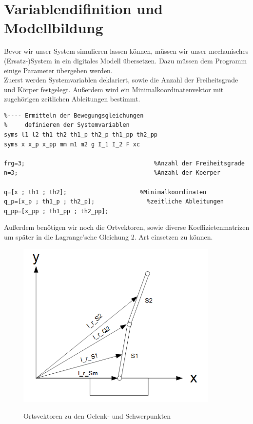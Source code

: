 \documentclass[a4paper, 10pt]{report}
\begin{document}
 \section{Variablendifinition und Modellbildung}
Bevor wir unser System simulieren lassen können, müssen wir unser mechanisches (Ersatz-)System in ein digitales Modell übersetzen. Dazu müssen dem Programm einige Parameter übergeben werden.\\
Zuerst werden Systemvariablen deklariert, sowie die Anzahl der Freiheitsgrade und Körper festgelegt. Außerdem wird ein Minimalkoordinatenvektor mit zugehörigen zeitlichen Ableitungen bestimmt.
\begin{lstlisting}
%---- Ermitteln der Bewegungsgleichungen
%     definieren der Systemvariablen
syms l1 l2 th1 th2 th1_p th2_p th1_pp th2_pp
syms x x_p x_pp mm m1 m2 g I_1 I_2 F xc

frg=3;                                     %Anzahl der Freiheitsgrade
n=3;                                       %Anzahl der Koerper

q=[x ; th1 ; th2];                     %Minimalkoordinaten
q_p=[x_p ; th1_p ; th2_p];               %zeitliche Ableitungen
q_pp=[x_pp ; th1_pp ; th2_pp];
\end{lstlisting}
\newpage \noindent
Außerdem benötigen wir noch die Ortvektoren, sowie diverse Koeffizietenmatrizen um später in die Lagrange'sche Gleichung 2. Art einsetzen zu können. 
\begin{figure}[h]
\centering  %
{\includegraphics[width=10cm]{Ortsvektoren}}
\caption{Ortsvektoren zu den Gelenk- und Schwerpunkten}
\end{figure}
\end{document}
